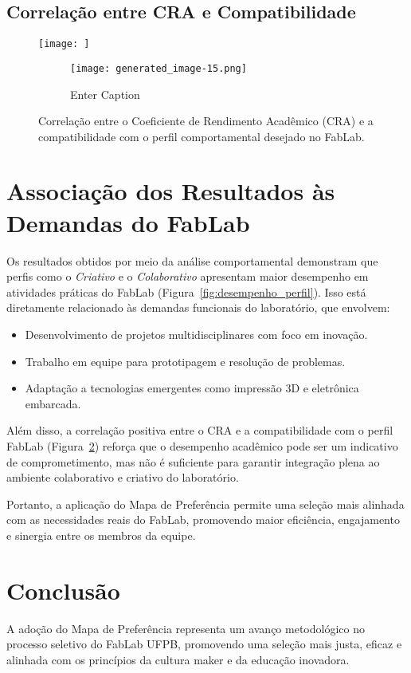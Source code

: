 \documentclass[12pt]{article}
\begin{document}
\subsection{Correlação entre CRA e Compatibilidade}
\begin{figure}[H]
    \centering
    \texttt{[image: ]}
\begin{figure}
        \centering
        \texttt{[image: generated\_image-15.png]}
        \caption{Enter Caption}
        \label{fig:placeholder}
    \end{figure}
        \caption{Correlação entre o Coeficiente de Rendimento Acadêmico (CRA) e a compatibilidade com o perfil comportamental desejado no FabLab.}
    \label{fig:correlacao_cra}
\end{figure}

\section{Associação dos Resultados às Demandas do FabLab}
Os resultados obtidos por meio da análise comportamental demonstram que perfis como o \textit{Criativo} e o \textit{Colaborativo} apresentam maior desempenho em atividades práticas do FabLab (Figura~\ref{fig:desempenho_perfil}). Isso está diretamente relacionado às demandas funcionais do laboratório, que envolvem:
\begin{itemize}
    \item Desenvolvimento de projetos multidisciplinares com foco em inovação.
    \item Trabalho em equipe para prototipagem e resolução de problemas.
    \item Adaptação a tecnologias emergentes como impressão 3D e eletrônica embarcada.
\end{itemize}

Além disso, a correlação positiva entre o CRA e a compatibilidade com o perfil FabLab (Figura~\ref{fig:correlacao_cra}) reforça que o desempenho acadêmico pode ser um indicativo de comprometimento, mas não é suficiente para garantir integração plena ao ambiente colaborativo e criativo do laboratório.

Portanto, a aplicação do Mapa de Preferência permite uma seleção mais alinhada com as necessidades reais do FabLab, promovendo maior eficiência, engajamento e sinergia entre os membros da equipe.

\section{Conclusão}
A adoção do Mapa de Preferência representa um avanço metodológico no processo seletivo do FabLab UFPB, promovendo uma seleção mais justa, eficaz e alinhada com os princípios da cultura maker e da educação inovadora.
\end{document}
